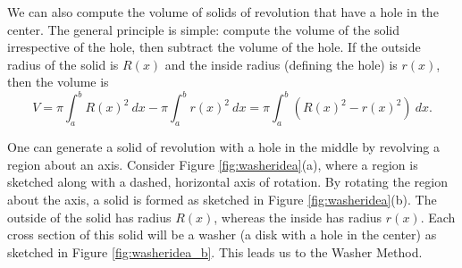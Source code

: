 We can also compute the volume of solids of revolution that have a hole in the center. The general principle is simple: compute the volume of the solid irrespective of the hole, then subtract the volume of the hole. If the outside radius of the solid is $R(x)$ and the inside radius (defining the hole) is $r(x)$, then the volume is 
$$V = \pi\int_a^b R(x)^2 \ dx - \pi\int_a^b r(x)^2\ dx = \pi\int_a^b \left(R(x)^2-r(x)^2\right)\ dx.$$

One can generate a solid of revolution with a hole in the middle by revolving a region about an axis. Consider Figure \ref{fig:washeridea}(a), where a region is sketched along with a dashed, horizontal axis of rotation. By rotating the region about the axis, a solid is formed as sketched in Figure \ref{fig:washeridea}(b). The outside of the solid has radius $R(x)$, whereas the inside has radius $r(x)$. Each cross section of this solid will be a washer (a disk with a hole in the center) as sketched in Figure \ref{fig:washeridea_b}.	This leads us to the Washer Method.


